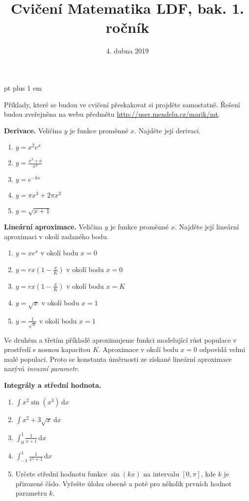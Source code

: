 \documentclass{article}
\let\oldtextbf\textbf
\def\textbf#1{%
  \oldtextbf{\color{red} #1}}
\begin{document}
 pt plus 1 em
\title{Cvičení Matematika LDF, bak. 1. ročník}
\date{4. dubna 2019}
\maketitle

Příklady, které se budou ve cvičení přeskakovat si projděte
samostatně. Řešení budou zveřejněna na webu předmětu \url{http://user.mendelu.cz/marik/mt}.

\newpage


\def\tg{\mathop{\mathrm{tg}}}
\def\cotg{\mathop{\mathrm{cotg}}}
\def\arctg{\mathop{\mathrm{arctg}}}

\textbf{Derivace.} Veličina $y$ je funkce proměnné $x$. Najděte její derivaci.
\begin{enumerate}[1)]
   pt
\item $y=x^2e^x$
\item $y=\frac{x^2+a}{x^3}$
\item $y=e^{-kx}$
\item $y=\pi x^3+2\pi x^2$
\item $y=\sqrt{x+1}$
\end{enumerate}

\newpage

\textbf{Lineární aproximace.} Veličina $y$ je funkce proměnné $x$. Najděte její lineární aproximaci v okolí zadaného bodu.
\begin{enumerate}[1)]
   pt
\item $y=xe^x$ v okolí bodu $x=0$
\item $y=rx\left(1-\frac xK\right)$ v okolí bodu $x=0$
\item $y=rx\left(1-\frac xK\right)$ v okolí bodu $x=K$
\item $y=\sqrt x$ v okolí bodu $x=1$
\item $y=\frac 1{\sqrt x}$ v okolí bodu $x=1$
\end{enumerate}

Ve druhém a třetím příkladě aproximujeme funkci modelující růst
populace v prostředí s nosnou kapacitou $K$. Aproximace v okolí bodu
$x=0$ odpovídá velmi malé populaci. Proto se konstanta úměrnosti ze
získané lineární aproximace nazývá \textit{invazní parametr}.

\newpage

\textbf{Integrály a střední hodnota.}

\begin{enumerate}[1)]
     pt
\item $\int x^2\sin(x^3)\,\mathrm dx$
\item $\int x^2+3\sqrt x\,\mathrm dx$
\item $\int_0^1 \frac 1{x+1}\,\mathrm dx$
\item $\int_{-1}^1 \frac 1{x^2+1}\,\mathrm dx$
\item Určete střední hodnotu funkce $\sin (kx)$ na intervalu $[0,\pi]$, kde $k$ je přirozené číslo. Vyřešte úlohu obecně a poté pro několik prvních hodnot parametru $k$.
\end{enumerate}
\end{document}
